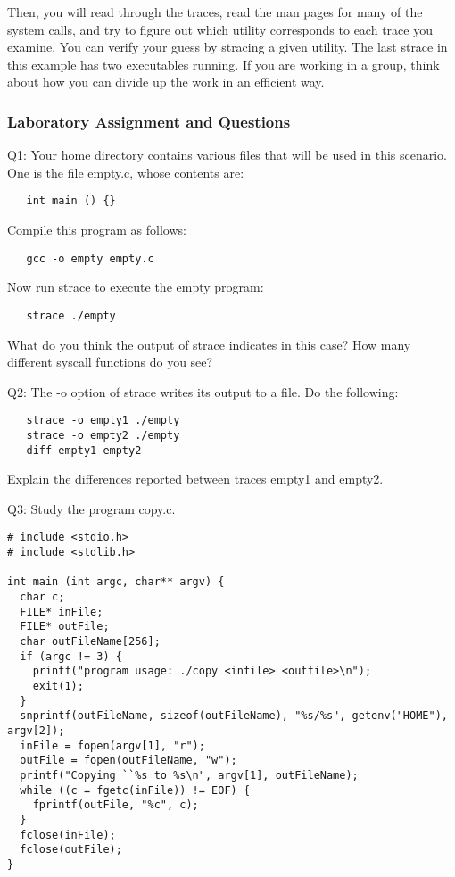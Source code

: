 \documentclass[11pt]{report}
\begin{document}
Then, you will read through the traces, read the man pages for many of the system calls,
and try to figure out which utility corresponds to each trace you examine.  You can verify
your guess by stracing a given utility.  The last strace in this example has two executables
running.
If you are working in a group, think about how you can divide up the work in an efficient way.

\subsubsection{Laboratory Assignment and Questions}
Q1: Your home directory contains various files that will be used in this scenario. 
One is the file empty.c, whose contents are: 

\begin{verbatim}
   int main () {}
\end{verbatim}

Compile this program as follows:
\begin{verbatim}
   gcc -o empty empty.c
\end{verbatim}

Now run strace to execute the empty program: 
\begin{verbatim}
   strace ./empty
\end{verbatim}

What do you think the output of strace indicates in this case? 
How many different syscall functions do you see?

\vspace{0.1in}
\noindent
Q2: The -o option of strace writes its output to a file. Do the following: 
\begin{verbatim}
   strace -o empty1 ./empty
   strace -o empty2 ./empty
   diff empty1 empty2
\end{verbatim}

Explain the differences reported between traces empty1 and empty2.

\vspace{0.1in}
\noindent
Q3: Study the program copy.c.  
\begin{verbatim}
# include <stdio.h>
# include <stdlib.h>

int main (int argc, char** argv) {
  char c;
  FILE* inFile;
  FILE* outFile;
  char outFileName[256];
  if (argc != 3) {
    printf("program usage: ./copy <infile> <outfile>\n");
    exit(1);
  }
  snprintf(outFileName, sizeof(outFileName), "%s/%s", getenv("HOME"), argv[2]);
  inFile = fopen(argv[1], "r");
  outFile = fopen(outFileName, "w");
  printf("Copying ``%s to %s\n", argv[1], outFileName);
  while ((c = fgetc(inFile)) != EOF) {
	fprintf(outFile, "%c", c);
  }
  fclose(inFile);
  fclose(outFile);
}
\end{verbatim}
\end{document}
